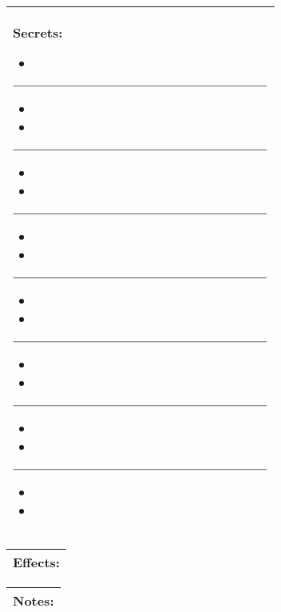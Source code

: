 \documentclass[a4paper, 12pt, finnish]{report}
\begin{document}
\begin{tabularx}{\columnwidth}{|X|} \hline
    Secrets: 
        {\scriptsize
\begin{itemize}
    \item[] 
\end{itemize}
$\rule{8cm}{0.15mm}$
\begin{itemize}
    \item[] 
    \item[] 
\end{itemize}
$\rule{8cm}{0.15mm}$
\begin{itemize}
    \item[] 
    \item[] 
\end{itemize}
$\rule{8cm}{0.15mm}$
\begin{itemize}
    \item[] 
    \item[] 
\end{itemize}
$\rule{8cm}{0.15mm}$
\begin{itemize}
    \item[] 
    \item[] 
\end{itemize}
$\rule{8cm}{0.15mm}$
\begin{itemize}
    \item[] 
    \item[] 
\end{itemize}
$\rule{8cm}{0.15mm}$
\begin{itemize}
    \item[] 
    \item[] 
\end{itemize}
$\rule{8cm}{0.15mm}$
\begin{itemize}
    \item[] 
    \item[] 
\end{itemize}
} 
\\
\hline
\end{tabularx}

\begin{tabularx}{\columnwidth}{|X|} \hline
    Effects: 
\vspace{270pt}
\\
\hline
\end{tabularx}

\begin{tabularx}{\columnwidth}{|X|} \hline
    Notes: 
\vspace{490pt}
\\
\hline
\end{tabularx}
\end{document}
